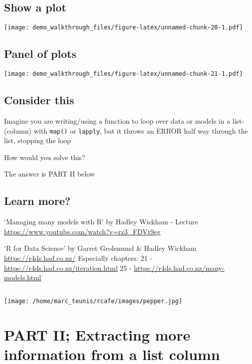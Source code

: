 \documentclass[]{article}
\begin{document}
\subsection{Show a plot}\label{show-a-plot}

\texttt{[image: demo\_walkthrough\_files/figure-latex/unnamed-chunk-20-1.pdf]}

\subsection{Panel of plots}\label{panel-of-plots}

\texttt{[image: demo\_walkthrough\_files/figure-latex/unnamed-chunk-21-1.pdf]}

\subsection{Consider this}\label{consider-this}

Imagine you are writing/using a function to loop over data or models in
a list-(column) with \texttt{map()} or \texttt{lapply}, but it throws an
ERROR half way through the list, stopping the loop

How would you solve this?

The answer is PART II below

\subsection{Learn more?}\label{learn-more}

`Managing many models with R' by Hadley Wickham - Lecture
\url{https://www.youtube.com/watch?v=rz3_FDVt9eg}

`R for Data Science' by Garret Grolemund \& Hadley Wickham
\url{https://r4ds.had.co.nz/} Especially chapters: 21 -
\url{https://r4ds.had.co.nz/iteration.html} 25 -
\url{https://r4ds.had.co.nz/many-models.html}

\subsection{}\label{section-1}

\texttt{[image: /home/marc\_teunis/rcafe/images/pepper.jpg]}

\section{PART II; Extracting more information from a list
column}\label{part-ii-extracting-more-information-from-a-list-column}
\end{document}
